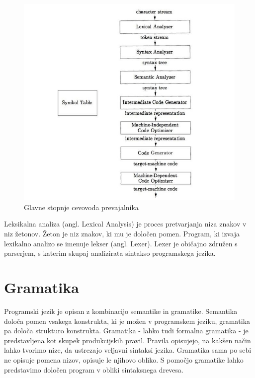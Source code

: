 \documentclass[a4paper, 12pt, tikz, border=5]{book}
\begin{document}
\begin{figure}[h!]
\begin{center}
\includegraphics[width=1\textwidth]{Pictures/compiler_phases.jpg}
\end{center}
\caption{Glavne stopnje cevovoda prevajalnika~\cite{appel}}
\label{compilerPhases}
\end{figure}

Leksikalna analiza (angl. Lexical Analysis) je proces pretvarjanja niza znakov v niz žetonov. Žeton je niz znakov, ki mu je določen pomen. Program, ki izvaja lexikalno analizo se imenuje lekser (angl. Lexer). Lexer je običajno združen s parserjem, s katerim skupaj analizirata sintakso programskega jezika.


\chapter{Gramatika} %
\label{chOpis}
Programski jezik je opisan z kombinacijo semantike in gramatike. Semantika določa pomen vsakega konstrukta, ki je možen v programskem jeziku, gramatika pa določa strukturo konstrukta.\cite{Introduc96:online}
Gramatika - lahko tudi formalna gramatika - je predstavljena kot skupek produkcijskih pravil. Pravila opisujejo, na kakšen način lahko tvorimo nize, da ustrezajo veljavni sintaksi jezika. Gramatika sama po sebi ne opisuje pomena nizov, opisuje le njihovo obliko. S pomočjo gramatike lahko predstavimo določen program v obliki sintaksnega drevesa.
\end{document}
